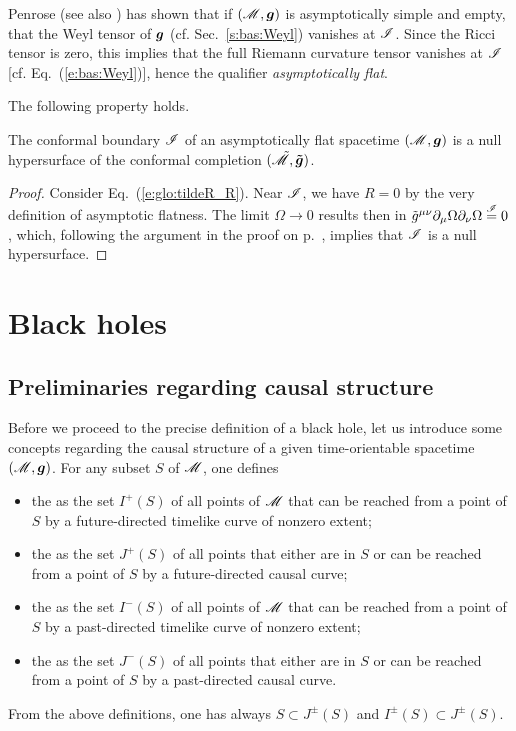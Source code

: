 Penrose \cite{Penro65b} (see also \cite{Fraue04}) has shown that if $(\mathscr{M},\bm{g})$
is asymptotically simple and empty, that the Weyl tensor of $\bm{g}$ (cf. Sec.~\ref{s:bas:Weyl})
vanishes at $\mathscr{I}$. Since the
Ricci tensor is zero, this implies that the full Riemann curvature tensor vanishes
at $\mathscr{I}$ [cf. Eq.~(\ref{e:bas:Weyl})], hence the qualifier \emph{asymptotically flat}.

The following property holds.
\begin{prop}
The conformal boundary $\mathscr{I}$ of an asymptotically flat spacetime $(\mathscr{M},\bm{g})$
is a null hypersurface of the conformal completion $(\tilde{\mathscr{M}},\bm{\tilde{g}})$.
\end{prop}
\begin{proof}
Consider Eq.~(\ref{e:glo:tildeR_R}). Near $\mathscr{I}$, we have $R=0$ by the
very definition of asymptotic flatness. The limit $\Omega\rightarrow 0$
results then in
$\tilde{g}^{\mu\nu} \partial_\mu \Omega \partial_\nu \Omega \stackrel{\mathscr{I}}{=} 0$,
which, following the argument in the proof on p.~\pageref{e:glo:tildeR_R}, implies that
$\mathscr{I}$ is a null hypersurface.
\end{proof}



\section{Black holes} \label{s:glo:BH}

\subsection{Preliminaries regarding causal structure}

Before we proceed to the precise definition of a black hole, let us introduce
some concepts regarding the causal structure of a given time-orientable spacetime $(\mathscr{M},\bm{g})$.
For any subset $S$ of $\mathscr{M}$, one defines
\begin{itemize}
\item the  as the set $I^+(S)$ of all
points of $\mathscr{M}$ that can be reached from a point of $S$ by a future-directed
timelike curve of nonzero extent;
\item the  as the set $J^+(S)$ of
all points that either are in $S$ or can be reached from a point of $S$ by a future-directed
causal curve;
\item the  as the set $I^-(S)$ of all
points of $\mathscr{M}$ that can be reached from a point of $S$ by a past-directed
timelike curve of nonzero extent;
\item the  as the set $J^-(S)$ of
all points that either are in $S$ or can be reached from a point of $S$ by a past-directed
causal curve.
\end{itemize}
From the above definitions, one has always $S \subset J^\pm(S)$ and
$I^\pm(S) \subset J^\pm(S)$.

